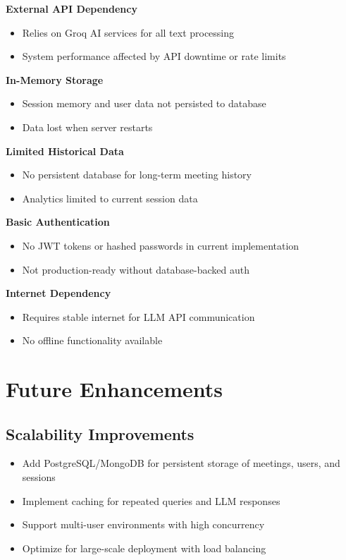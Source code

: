 \documentclass[12pt,a4paper]{article}
\begin{document}
\textbf{External API Dependency}
\begin{itemize}
  \item Relies on Groq AI services for all text processing
  \item System performance affected by API downtime or rate limits
\end{itemize}

\textbf{In-Memory Storage}
\begin{itemize}
  \item Session memory and user data not persisted to database
  \item Data lost when server restarts
\end{itemize}

\textbf{Limited Historical Data}
\begin{itemize}
  \item No persistent database for long-term meeting history
  \item Analytics limited to current session data
\end{itemize}

\textbf{Basic Authentication}
\begin{itemize}
  \item No JWT tokens or hashed passwords in current implementation
  \item Not production-ready without database-backed auth
\end{itemize}

\textbf{Internet Dependency}
\begin{itemize}
  \item Requires stable internet for LLM API communication
  \item No offline functionality available
\end{itemize}


\section{Future Enhancements}

\subsection{Scalability Improvements}
\begin{itemize}
  \item Add PostgreSQL/MongoDB for persistent storage of meetings, users, and sessions
  \item Implement caching for repeated queries and LLM responses
  \item Support multi-user environments with high concurrency
  \item Optimize for large-scale deployment with load balancing
\end{itemize}
\end{document}
